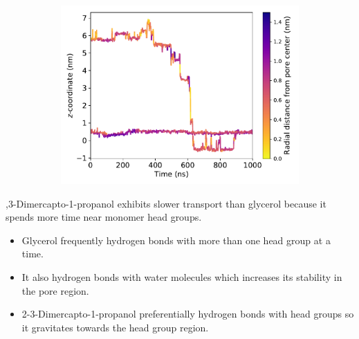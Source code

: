 \documentclass{article}
\begin{document}
  \begin{figure}
  \centering
  \begin{subfigure}{0.45\textwidth}
  \includegraphics[width=\linewidth]{SOH_trace.pdf}
  \caption{}\label{fig:SOH_trace}
  \end{subfigure}
  \caption{}
  \end{figure}
  
  
  ,3-Dimercapto-1-propanol exhibits slower transport than glycerol because it spends more time
  near monomer head groups. %
  \begin{itemize}
    \item Glycerol frequently hydrogen bonds with more than one head group at a time.
    \item It also hydrogen bonds with water molecules which increases its stability
    in the pore region.
    \item 2-3-Dimercapto-1-propanol preferentially hydrogen bonds with head groups 
    so it gravitates towards the head group region.
  \end{itemize} 
  
\end{document}
